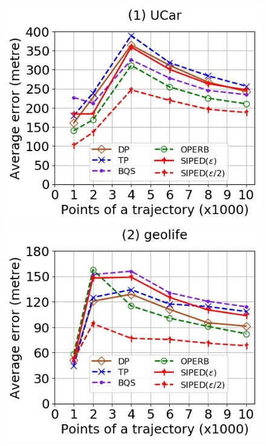 \begin{figure}[tb!]
	\centering
	\includegraphics[scale=0.400]{Figures/Exp-where-PED-error-size-service.jpg} 	\hspace{2ex}
	\includegraphics[scale=0.400]{Figures/Exp-where-PED-error-size-geolife.jpg}	\hspace{2ex}

\end{figure}
